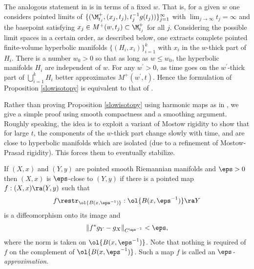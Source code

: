 \begin{remark}
  \label{rem:kl-hyperbolic-rigidity-stabilization-thick-part-characterization-thick-thin-geometry}

The analogous statement in \cite[Section 7.3]{Perelman2} is in terms of a fixed $w$.
That is, for a given $w$ one considers pointed limits of
$\{(\M^+_{t_j}, (x_j, t_j), t_j^{-1} g(t_j))\}_{j=1}^\infty$
with $\lim_{j \rightarrow \infty} t_j = \infty$ and the basepoint
satisfying
$x_j \in M^+(w, t_j) \subset \M^+_{t_j}$
for all $j$. Considering
the possible limit spaces in a certain order, as described below,
one extracts complete pointed finite-volume hyperbolic manifolds $\{(H_i, x_i)\}_{i=1}^k$
with $x_i$ in the $w$-thick part of $H_i$.
There is a number
$w_0 > 0$ so that as long as $w \le w_0$, the hyperbolic manifolds
$H_i$ are independent of $w$.
For any $w^\prime > 0$,
as time goes on the $w^\prime$-thick part of  $\bigcup_{i=1}^k H_i$
better approximates $M^+(w^\prime, t)$.
Hence the formulation of
Proposition \ref{slowisotopy} is equivalent to that of
\cite[Section 7.3]{Perelman2}.
\end{remark}

Rather than proving Proposition \ref{slowisotopy}
using harmonic maps
as in \cite{Hamiltonn},
we give a simple proof using
smooth compactness and a smoothing argument.  Roughly speaking, the idea is
to exploit a variant of Mostow rigidity to show that for large $t$, the components
of the $w$-thick part change slowly with time, and
are close to hyperbolic manifolds which are isolated (due to a refinement
of Mostow-Prasad rigidity). This forces them to eventually stabilize.

\begin{definition}
  \label{def:kl-hyperbolic-rigidity-stabilization-thick-part-pointed-smooth-closeness}

If $(X,x)$ and $(Y,y)$ are pointed smooth Riemannian manifolds
and $\eps>0$ then $(X,x)$ is $\eps$-close to $(Y,y)$
if there is a pointed map $f:(X,x)\ra (Y,y)$ such that
\begin{equation}
f\restr_{\ol{B(x,\eps^{-1})}}:\ol{B(x,\eps^{-1})}\ra Y
\end{equation}
 is a diffeomorphism onto its image
and
\begin{equation}
\label{fapprox}
\|f^*g_Y-g_X\|_{C^{\eps^{-1}}}<\eps,
\end{equation}
where the norm is taken on $\ol{B(x,\eps^{-1})}$.
Note that nothing is required of $f$ on the complement of $\ol{B(x,\eps^{-1})}$.
Such a map $f$ is called an {\em $\eps$-approximation}.
\end{definition}

